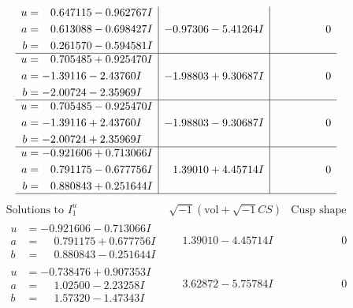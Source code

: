 \documentclass[1p]{elsarticle_modified}
\theoremstyle{definition}
\newcommand{\I}{\sqrt{-1}}
\begin{document}
$$\begin{array}{c|c|c}
\begin{aligned}
u &= \phantom{-}0.647115 - 0.962767 I \\
a &= \phantom{-}0.613088 - 0.698427 I \\
b &= \phantom{-}0.261570 - 0.594581 I\end{aligned}
 & -0.97306 - 5.41264 I & \phantom{-0.000000 } 0 \\ \hline\begin{aligned}
u &= \phantom{-}0.705485 + 0.925470 I \\
a &= -1.39116 - 2.43760 I \\
b &= -2.00724 - 2.35969 I\end{aligned}
 & -1.98803 + 9.30687 I & \phantom{-0.000000 } 0 \\ \hline\begin{aligned}
u &= \phantom{-}0.705485 - 0.925470 I \\
a &= -1.39116 + 2.43760 I \\
b &= -2.00724 + 2.35969 I\end{aligned}
 & -1.98803 - 9.30687 I & \phantom{-0.000000 } 0 \\ \hline\begin{aligned}
u &= -0.921606 + 0.713066 I \\
a &= \phantom{-}0.791175 - 0.677756 I \\
b &= \phantom{-}0.880843 + 0.251644 I\end{aligned}
 & \phantom{-}1.39010 + 4.45714 I & \phantom{-0.000000 } 0\\
 \hline 
 \end{array}$$\newpage$$\begin{array}{c|c|c}  
\text{Solutions to }I^u_{1}& \I (\text{vol} + \sqrt{-1}CS) & \text{Cusp shape}\\
 \hline 
\begin{aligned}
u &= -0.921606 - 0.713066 I \\
a &= \phantom{-}0.791175 + 0.677756 I \\
b &= \phantom{-}0.880843 - 0.251644 I\end{aligned}
 & \phantom{-}1.39010 - 4.45714 I & \phantom{-0.000000 } 0 \\ \hline\begin{aligned}
u &= -0.738476 + 0.907353 I \\
a &= \phantom{-}1.02500 - 2.23258 I \\
b &= \phantom{-}1.57320 - 1.47343 I\end{aligned}
 & \phantom{-}3.62872 - 5.75784 I & \phantom{-0.000000 } 0 \\ \hline\begin{aligned}

\end{aligned}
\end{array}$$
\end{document}
